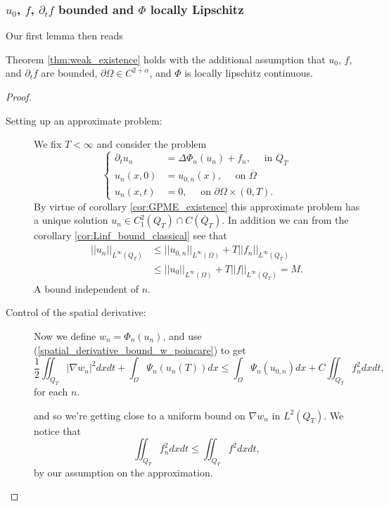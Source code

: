 \documentclass[11pt, a4paper]{article}
\begin{document}
\subsubsection{$u_0$, $f$, $\partial_t f$ bounded and $\Phi$ locally Lipschitz}
Our first lemma then reads
\begin{lemma}
\label{lem:existence_part1}
Theorem \ref{thm:weak_existence} holds with the additional assumption that $u_0$, $f$, and $\partial_t f$ are bounded, $\partial \Omega \in C^{2+\alpha}$, and $\Phi$ is locally lipschitz continuous.
\end{lemma}

\begin{proof}

\begin{description}
	\item[Setting up an approximate problem:] We fix $T<\infty$ and consider the problem
		\begin{equation}
		\label{approximate_problem}
			\begin{cases}
			\partial_t u_n &= \Delta\Phi_n(u_n) + f_n, \quad \text{ in } Q_T \\
			u_n(x,0) &= u_{0,n}(x),	\quad \text{ on } \overline{\Omega} \\
			u_n(x,t) &= 0, \quad \text{ on }  \partial \Omega \times (0,T).
			\end{cases}
		\end{equation}			
	By virtue of corollary \ref{cor:GPME_existence} this approximate problem has a unique solution $u_n \in C^2_1(Q_T)\cap C(\overline{Q}_T)$. In addition we can from the corollary   \ref{cor:Linf_bound_classical} see that
	\begin{align*}
	||u_n||_{L^\infty(Q_T)} &\leq ||u_{0,n}||_{L^\infty(\Omega)} + T||f_n||_{L^\infty(Q_T)} \\
	&\leq ||u_0||_{L^\infty(\Omega)} + T||f||_{L^\infty(Q_T)} = M.
	\end{align*}
	A bound independent of $n$.
	
	\item[Control of the spatial derivative:] Now we define $w_n = \Phi_n(u_n)$, and use (\ref{spatial_derivative_bound_w_poincare}) to get 
	\begin{equation}
	\label{exist_proof_spatial}
	\frac{1}{2}\iint_{Q_T}|\nabla w_n|^2 dxdt + \int_\Omega \Psi_n(u_n(T))dx  \leq \int_\Omega \Psi_n(u_{0,n})dx + C\iint_{Q_T}f_n^2 dxdt,
	\end{equation}
	for each $n$.


	and so we're getting close to a uniform bound on $\nabla w_n$ in $L^2(Q_T)$. We notice that
	\begin{equation*}
	\iint_{Q_T}f_n^2dxdt \leq \iint_{Q_T} f^2 dxdt,
	\end{equation*}
	by our assumption on the approximation.
	

\end{description}
\end{proof}
\end{document}
